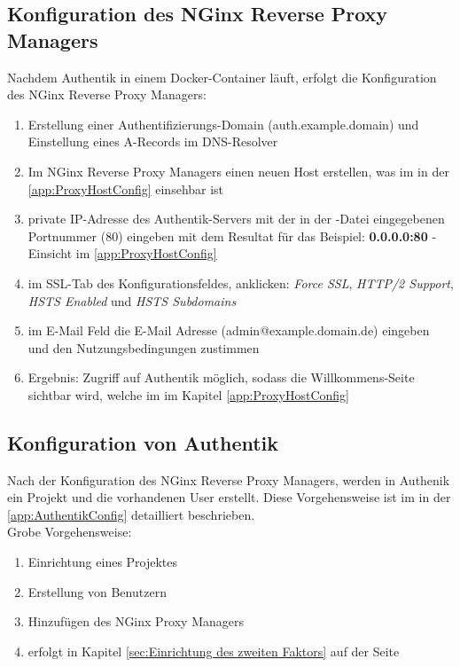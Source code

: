 \subsection{Konfiguration des NGinx Reverse Proxy Managers}
\label{sec:Konfiguration des NGinx Reverse Proxy Managers}
Nachdem Authentik in einem Docker-Container läuft, erfolgt die Konfiguration des NGinx Reverse Proxy Managers:
\begin{enumerate}[label=\arabic*.]
    \item Erstellung einer Authentifizierungs-Domain (auth.example.domain) und Einstellung eines A-Records im DNS-Resolver
    \item Im NGinx Reverse Proxy Managers einen neuen Host erstellen, was im  in der \ref{app:ProxyHostConfig}  einsehbar ist
    \item private IP-Adresse des Authentik-Servers mit der in der \textbf{}-Datei eingegebenen Portnummer (80) eingeben 
    mit dem Resultat für das Beispiel: \textbf{0.0.0.0:80} - Einsicht im \ref{app:ProxyHostConfig} 
    \item im SSL-Tab des Konfigurationsfeldes, anklicken: \textit{Force SSL}, \textit{HTTP/2 Support}, \textit{HSTS Enabled} und \textit{HSTS Subdomains}
    \item im E-Mail Feld die E-Mail Adresse (admin@example.domain.de) eingeben und den Nutzungsbedingungen zustimmen
    \item Ergebnis: Zugriff auf Authentik möglich, sodass die Willkommens-Seite sichtbar wird, welche im  im Kapitel 
    \ref{app:ProxyHostConfig} 
\end{enumerate}

\subsection{Konfiguration von Authentik}
\label{sec: Konfiguration von Authentik}
Nach der Konfiguration des NGinx Reverse Proxy Managers, werden in Authenik ein Projekt und die vorhandenen User erstellt. Diese Vorgehensweise 
ist im  in der \ref{app:AuthentikConfig}  detailliert beschrieben.
\\Grobe Vorgehensweise:
\begin{enumerate}
    \item Einrichtung eines Projektes
    \item Erstellung von Benutzern
    \item Hinzufügen des NGinx Proxy Managers
    \item {} erfolgt in Kapitel \ref{sec:Einrichtung des zweiten Faktors} auf der 
    Seite \pageref{sec:Einrichtung des zweiten Faktors}
\end{enumerate}



